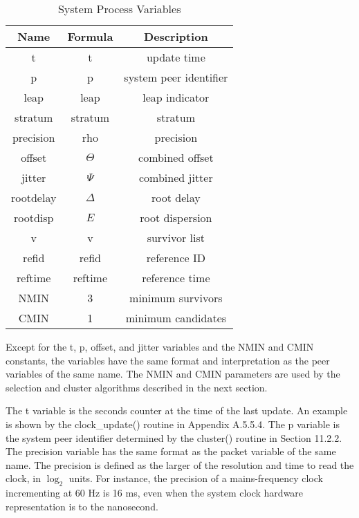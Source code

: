 \begin{table}[htb]
\center
\begin{tabular}{c | c | c}
Name & Formula & Description \\
\hline
\hline
t         & t          & update time            \\
p         & p          & system peer identifier \\
leap      & leap       & leap indicator         \\
stratum   & stratum    & stratum                \\
precision & rho        & precision              \\
offset    & $ \Theta $      & combined offset        \\
jitter    & $ \Psi $        & combined jitter        \\
rootdelay & $ \Delta $      & root delay             \\
rootdisp  & $ E $    & root dispersion        \\
v         & v          & survivor list          \\
refid     & refid      & reference ID           \\
reftime   & reftime    & reference time         \\
NMIN      & 3          & minimum survivors      \\
CMIN      & 1          & minimum candidates     \\
\hline
\end{tabular}
\label{system_process_variables}
\caption{System Process Variables}
\end{table}

Except for the t, p, offset, and jitter variables and the NMIN and
CMIN constants, the variables have the same format and interpretation
as the peer variables of the same name.  The NMIN and CMIN parameters
are used by the selection and cluster algorithms described in the
next section.

The t variable is the seconds counter at the time of the last update.
An example is shown by the clock\_update() routine in
Appendix A.5.5.4.  The p variable is the system peer identifier
determined by the cluster() routine in Section 11.2.2.  The precision
variable has the same format as the packet variable of the same name.
The precision is defined as the larger of the resolution and time to
read the clock, in $ \log_2 $ units.  For instance, the precision of a
mains-frequency clock incrementing at 60 Hz is 16 ms, even when the
system clock hardware representation is to the nanosecond.

